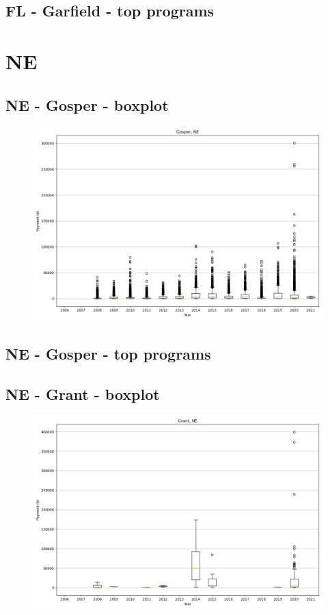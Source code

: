 \subsection*{FL - Garfield - top programs}

\newpage
\section*{NE}
\subsection*{NE - Gosper - boxplot}
\begin{figure}[h]
\centering
\includegraphics[width=7in]{../output/boxplots/counties/Gosper-NE_boxplot.png}
\end{figure}


\subsection*{NE - Gosper - top programs}

\newpage
\subsection*{NE - Grant - boxplot}
\begin{figure}[h]
\centering
\includegraphics[width=7in]{../output/boxplots/counties/Grant-NE_boxplot.png}
\end{figure}



